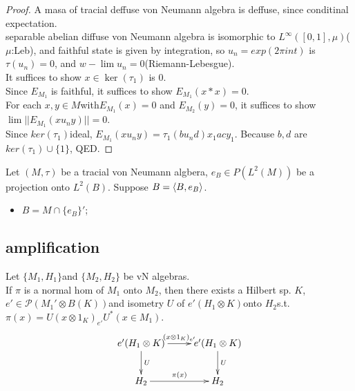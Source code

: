 \begin{proof}
A masa of tracial deffuse von Neumann algebra is deffuse, since conditinal expectation. \\
separable abelian diffuse von Neumann algebra is isomorphic to $L^{\infty}([0,1],\mu)$($\mu$:Leb), 
and faithful state is given by integration, so $u_n = exp(2 \pi i n t)$ is $\tau(u_n) = 0$, and $w-\lim u_n = 0$(Riemann-Lebesgue). \\

It suffices to show $x \in \ker ({\tau}_1)$ is $0$. \\
Since $E_{M_1}$ is faithful, it suffices to show $E_{M_1} (x*x) = 0$. \\
For each $x,y \in M$with$E_{M_1} (x) = 0$ and $E_{M_2} (y) = 0$, it suffices to show $\lim ||E_{M_1} (x u_n y) ||=0$.\\
Since $ker({\tau}_1)$ideal, $E_{M_1} (x u_n y) = {\tau}_1 (b u_n d) x_1 a c y_1$. Because $b,d$ are $ker({\tau}_1) \cup \{ 1 \}$, QED.
\end{proof}

\begin{theorem}
Let $(M,\tau)$ be a tracial von Neumann algbera, $e_B \in P(L^2(M))$ be a projection onto $L^2(B)$. Suppose $B=\langle B,e_B\rangle$.\\
\begin{itemize}
\item $B = M \cap \{e_B \}'$;
\end{itemize}

\end{theorem}

\subsection{amplification}

\begin{theorem}
  Let $\{M_1,H_1\}$and $\{M_2, H_2\}$ be vN algebras. \\
  If $\pi$ is a normal hom of $M_1$ onto $M_2$, then there exists a Hilbert sp. $K$, $e' \in \mathcal{P}(M_1'\otimes B(K))$and isometry $U$ of $e'(H_1\otimes K)$onto $H_2$s.t. $\pi(x)= U(x\otimes 1_K)_{e'}U^*  (x \in M_1)$.
  \[
  \xymatrix{
    e'(H_1\otimes K) \ar[r]^{(x\otimes 1_K)_{e'}} \ar[d]^U & e'(H_1\otimes K) \ar[d]^U \\
    H_2 \ar[r]^{\pi(x)}& H_2
  }
  \]
\end{theorem}

